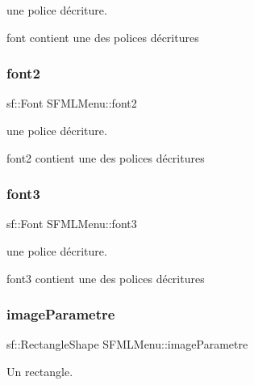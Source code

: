 une police d\textquotesingle{}écriture. 

font contient une des polices d\textquotesingle{}écritures \mbox{\label{class_s_f_m_l_menu_a5c59e11d8f5fb35c0922db98de61fa39}} 
\subsubsection{\texorpdfstring{font2}{font2}}
{\footnotesize\ttfamily sf\+::\+Font S\+F\+M\+L\+Menu\+::font2\hspace{0.3cm}{\ttfamily [private]}}



une police d\textquotesingle{}écriture. 

font2 contient une des polices d\textquotesingle{}écritures \mbox{\label{class_s_f_m_l_menu_a49f27c39cdc6106ba0cb3ca253a6cb05}} 
\subsubsection{\texorpdfstring{font3}{font3}}
{\footnotesize\ttfamily sf\+::\+Font S\+F\+M\+L\+Menu\+::font3\hspace{0.3cm}{\ttfamily [private]}}



une police d\textquotesingle{}écriture. 

font3 contient une des polices d\textquotesingle{}écritures \mbox{\label{class_s_f_m_l_menu_a14d6195ffe83debda348a246526cbec3}} 
\subsubsection{\texorpdfstring{image\+Parametre}{imageParametre}}
{\footnotesize\ttfamily sf\+::\+Rectangle\+Shape S\+F\+M\+L\+Menu\+::image\+Parametre\hspace{0.3cm}{\ttfamily [private]}}



Un rectangle. 

